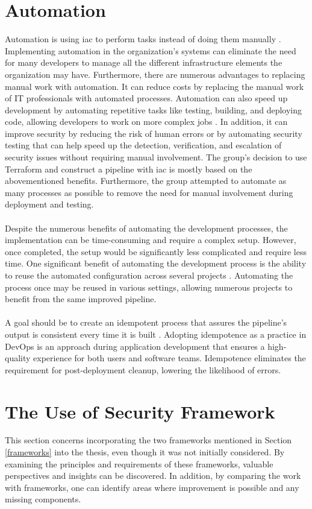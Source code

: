 \section{Automation}
Automation is using \gls{iac} to perform tasks instead of doing them manually \cite{automationredhat}. Implementing automation in the organization's systems can eliminate the need for many developers to manage all the different infrastructure elements the organization may have. Furthermore, there are numerous advantages to replacing manual work with automation. It can reduce costs by replacing the manual work of IT professionals with automated processes.
\newpage
Automation can also speed up development by automating repetitive tasks like testing, building, and deploying code, allowing developers to work on more complex jobs \cite{automation}. In addition, it can improve security by reducing the risk of human errors or by automating security testing that can help speed up the detection, verification, and escalation of security issues without requiring manual involvement. The group's decision to use Terraform and construct a pipeline with \gls{iac} is mostly based on the abovementioned benefits. Furthermore, the group attempted to automate as many processes as possible to remove the need for manual involvement during deployment and testing. 
\\~\\
Despite the numerous benefits of automating the development processes, the implementation can be time-consuming and require a complex setup. However, once completed, the setup would be significantly less complicated and require less time. One significant benefit of automating the development process is the ability to reuse the automated configuration across several projects \cite{reusepipeline}. Automating the process once may be reused in various settings, allowing numerous projects to benefit from the same improved \gls{pipeline}. 
\\~\\
A goal should be to create an \gls{idempotent} process that assures the pipeline's output is consistent every time it is built \cite{idempotent}. Adopting idempotence as a practice in DevOps is an approach during application development that ensures a high-quality experience for both users and software teams. Idempotence eliminates the requirement for post-deployment cleanup, lowering the likelihood of errors. 

\section{The Use of Security Framework}
This section concerns incorporating the two frameworks mentioned in Section \ref{frameworks} into the thesis, even though it was not initially considered. By examining the principles and requirements of these frameworks, valuable perspectives and insights can be discovered. In addition, by comparing the work with frameworks, one can identify areas where improvement is possible and any missing components.

